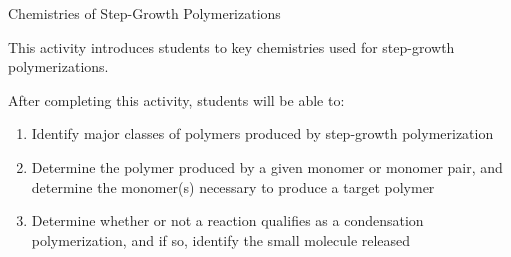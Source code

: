 %
%
%
%

\renewcommand{\figpath}{content/polymchem/stepgrowth/stepgrowth-chemistries/figs}
\renewcommand{\labelbase}{stepgrowth-chem}

\begin{activity}{Chemistries of Step-Growth Polymerizations}

\begin{instructornotes}

	This activity introduces students to key chemistries used for step-growth polymerizations.
	
	After completing this activity, students will be able to:
			\begin{enumerate}
				\item Identify major classes of polymers produced by step-growth polymerization
				\item Determine the polymer produced by a given monomer or monomer pair, and determine the monomer(s) necessary to produce a target polymer
				\item Determine whether or not a reaction qualifies as a condensation polymerization, and if so, identify the small molecule released
			\end{enumerate}
	
			

\end{instructornotes}
\end{activity}
